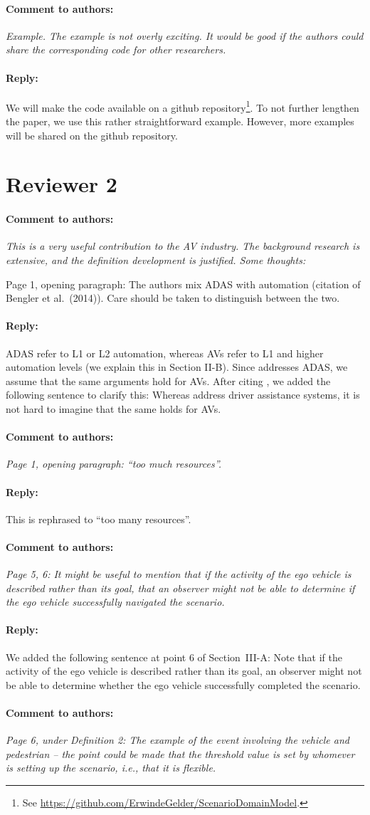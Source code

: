 \documentclass[10pt,final,a4paper,oneside,onecolumn]{article}
\newcommand{\toauthor}{\paragraph*{Comment to authors:} \itshape}
\newcommand{\fromauthor}{\paragraph*{Reply:} \normalfont}
\newcommand{\cstart}{\cbstart\color{red}}
\newcommand{\cend}{\cbend\color{black}}
\begin{document}
\toauthor Example. The example is not overly exciting. It would be good if the authors could share the corresponding code for other researchers.

\fromauthor We will make the code available on a github repository\footnote{See \url{https://github.com/ErwindeGelder/ScenarioDomainModel}.}. To not further lengthen the paper, we use this rather straightforward example. However, more examples will be shared on the github repository.



\section*{Reviewer 2}

\toauthor This is a very useful contribution to the AV industry. The background research is extensive, and the definition development is justified. Some thoughts:

Page 1, opening paragraph: The authors mix ADAS with automation (citation of Bengler et al.\ (2014)). Care should be taken to distinguish between the two.

\fromauthor ADAS refer to L1 or L2 automation, whereas AVs refer to L1 and higher automation levels (we explain this in Section II-B). Since \textcite{bengler2014threedecades} addresses ADAS, we assume that the same arguments hold for AVs. After citing \textcite{bengler2014threedecades}, we added the following sentence to clarify this: \cstart Whereas \textcite{bengler2014threedecades} address driver assistance systems, it is not hard to imagine that the same holds for AVs.\cend

\toauthor Page 1, opening paragraph: ``too much resources''.

\fromauthor This is rephrased to ``\cstart too many resources\cend''.

\toauthor Page 5, 6: It might be useful to mention that if the activity of the ego vehicle is described rather than its goal, that an observer might not be able to determine if the ego vehicle successfully navigated the scenario.

\fromauthor We added the following sentence at point 6 of Section~III-A: \cstart Note that if the activity of the ego vehicle is described rather than its goal, an observer might not be able to determine whether the ego vehicle successfully completed the scenario.\cend

\toauthor Page 6, under Definition 2: The example of the event involving the vehicle and pedestrian -- the point could be made that the threshold value is set by whomever is setting up the scenario, i.e., that it is flexible.
\end{document}
